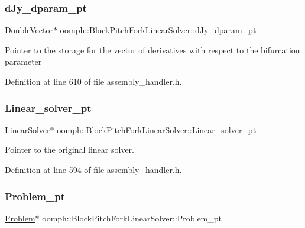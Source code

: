 \subsubsection{\texorpdfstring{d\+Jy\+\_\+dparam\+\_\+pt}{dJy\_dparam\_pt}}
{\footnotesize\ttfamily \hyperlink{classoomph_1_1DoubleVector}{Double\+Vector}$\ast$ oomph\+::\+Block\+Pitch\+Fork\+Linear\+Solver\+::d\+Jy\+\_\+dparam\+\_\+pt\hspace{0.3cm}{\ttfamily [private]}}

Pointer to the storage for the vector of derivatives with respect to the bifurcation parameter 

Definition at line 610 of file assembly\+\_\+handler.\+h.

\mbox{\label{classoomph_1_1BlockPitchForkLinearSolver_afcf84124d724d6bd961870fbcdc7b9e4}} 
\subsubsection{\texorpdfstring{Linear\+\_\+solver\+\_\+pt}{Linear\_solver\_pt}}
{\footnotesize\ttfamily \hyperlink{classoomph_1_1LinearSolver}{Linear\+Solver}$\ast$ oomph\+::\+Block\+Pitch\+Fork\+Linear\+Solver\+::\+Linear\+\_\+solver\+\_\+pt\hspace{0.3cm}{\ttfamily [private]}}



Pointer to the original linear solver. 



Definition at line 594 of file assembly\+\_\+handler.\+h.

\mbox{\label{classoomph_1_1BlockPitchForkLinearSolver_a5819a48984aa1a9a68c28e106bc22f90}} 
\subsubsection{\texorpdfstring{Problem\+\_\+pt}{Problem\_pt}}
{\footnotesize\ttfamily \hyperlink{classoomph_1_1Problem}{Problem}$\ast$ oomph\+::\+Block\+Pitch\+Fork\+Linear\+Solver\+::\+Problem\+\_\+pt\hspace{0.3cm}{\ttfamily [private]}}



